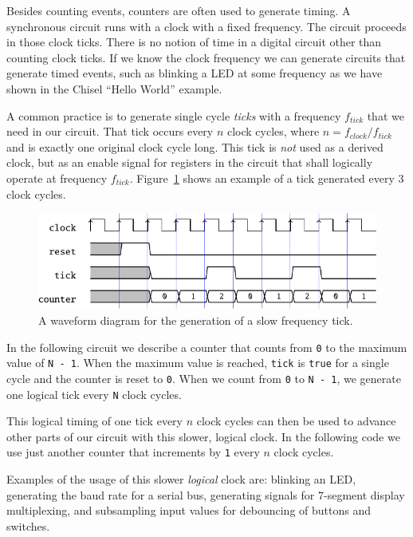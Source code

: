 \documentclass[%
    10pt,
    headinclude, footexclude,
    openright, %
    notitlepage,
    cleardoubleempty,
    headsepline,
    pointlessnumbers,
    bibtotoc, idxtotoc,
    ]{scrbook}
\newcommand{\code}[1]{{\small{\texttt{#1}}}}
\begin{document}
Besides counting events, counters are often used to generate timing.
A synchronous circuit runs with a clock with a fixed frequency.
The circuit proceeds in those clock ticks. There is no notion of time in a digital
circuit other than counting clock ticks. If we know the clock frequency we
can generate circuits that generate timed events, such as blinking a LED
at some frequency as we have shown in the Chisel ``Hello World'' example.

A common practice is to generate single cycle \emph{ticks} with a frequency $f_{tick}$
that we need in our circuit. That tick occurs every $n$ clock cycles,
where $n = f_{clock}/f_{tick}$ and is exactly one original clock cycle long.
This tick is \emph{not} used as a derived clock, but as an enable signal for
registers in the circuit that shall logically operate at frequency $f_{tick}$.
Figure~\ref{fig:tick-wave} shows an example of a tick generated every
3 clock cycles.

\begin{figure}
  \centering
  \includegraphics[scale=1]{figures/tick_wave}
  \caption{A waveform diagram for the generation of a slow frequency tick.}
  \label{fig:tick-wave}
\end{figure}


In the following circuit we describe a counter that counts from \code{0}
to the maximum value of \code{N - 1}. When the maximum value is reached,
\code{tick} is \code{true} for a single cycle and the counter is reset to \code{0}.
When we count from \code{0} to \code{N - 1}, we generate one logical tick
every \code{N} clock cycles.


\noindent This logical timing of one tick every $n$ clock cycles can then be used
to advance other parts of our circuit with this slower, logical clock.
In the following code we use just another counter that increments by \code{1}
every $n$ clock cycles.


Examples of the usage of this slower \emph{logical} clock are: blinking an LED,
generating the baud rate for a serial bus, generating signals for 7-segment
display multiplexing, and subsampling input values for debouncing of buttons
and switches. 
\end{document}
